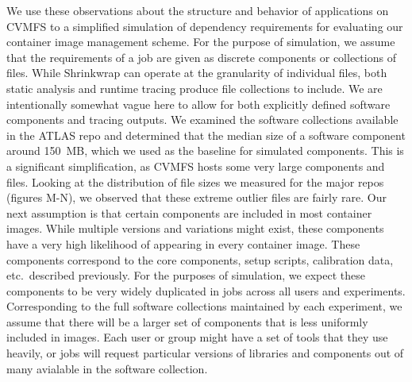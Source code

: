 \documentclass[sigconf]{acmart}
\begin{document}
We use these observations about the structure and behavior of applications on CVMFS to a simplified simulation of dependency requirements for evaluating our container image management scheme.
For the purpose of simulation,
we assume that the requirements of a job are given as discrete components or collections of files.
While Shrinkwrap can operate at the granularity of individual files,
both static analysis and runtime tracing produce file collections to include.
We are intentionally somewhat vague here to allow for both explicitly defined software components and tracing outputs.
We examined the software collections available in the ATLAS repo and determined that the median size of a software component around 150~MB,
which we used as the baseline for simulated components.
This is a significant simplification,
as CVMFS hosts some very large components and files.
Looking at the distribution of file sizes we measured for the major repos (figures M-N),
we observed that these extreme outlier files are fairly rare.
Our next assumption is that certain components are included in most container images.
While multiple versions and variations might exist,
these components have a very high likelihood of appearing in every container image.
These components correspond to the core components, setup scripts, calibration data, etc.\ described previously.
For the purposes of simulation,
we expect these components to be very widely duplicated in jobs across all users and experiments.
Corresponding to the full software collections maintained by each experiment,
we assume that there will be a larger set of components that is less uniformly included in images.
Each user or group might have a set of tools that they use heavily,
or jobs will request particular versions of libraries and components out of many avialable in the software collection.
\end{document}

